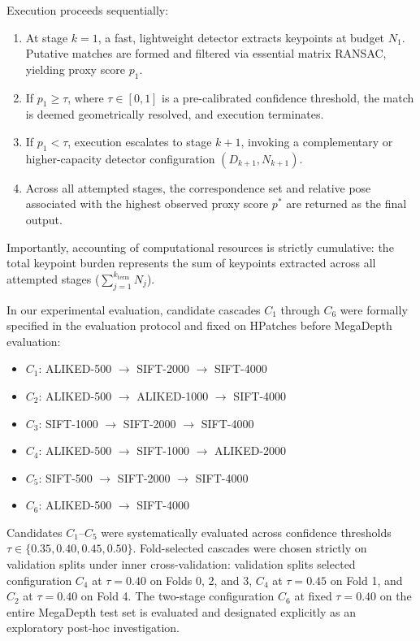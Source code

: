 \documentclass[conference]{IEEEtran}
\begin{document}
Execution proceeds sequentially:
\begin{enumerate}
    \item At stage $k=1$, a fast, lightweight detector extracts keypoints at budget $N_1$. Putative matches are formed and filtered via essential matrix RANSAC, yielding proxy score $p_1$.
    \item If $p_1 \ge \tau$, where $\tau \in [0, 1]$ is a pre-calibrated confidence threshold, the match is deemed geometrically resolved, and execution terminates.
    \item If $p_1 < \tau$, execution escalates to stage $k+1$, invoking a complementary or higher-capacity detector configuration $(D_{k+1}, N_{k+1})$.
    \item Across all attempted stages, the correspondence set and relative pose associated with the highest observed proxy score $p^*$ are returned as the final output.
\end{enumerate}

Importantly, accounting of computational resources is strictly cumulative: the total keypoint burden represents the sum of keypoints extracted across all attempted stages ($\sum_{j=1}^{k_{\text{term}}} N_j$).

In our experimental evaluation, candidate cascades $C_1$ through $C_6$ were formally specified in the evaluation protocol and fixed on HPatches before MegaDepth evaluation:
\begin{itemize}
    \item $C_1$: ALIKED-500 $\to$ SIFT-2000 $\to$ SIFT-4000
    \item $C_2$: ALIKED-500 $\to$ ALIKED-1000 $\to$ SIFT-4000
    \item $C_3$: SIFT-1000 $\to$ SIFT-2000 $\to$ SIFT-4000
    \item $C_4$: ALIKED-500 $\to$ SIFT-1000 $\to$ ALIKED-2000
    \item $C_5$: SIFT-500 $\to$ SIFT-2000 $\to$ SIFT-4000
    \item $C_6$: ALIKED-500 $\to$ SIFT-4000
\end{itemize}
Candidates $C_1$--$C_5$ were systematically evaluated across confidence thresholds $\tau \in \{0.35, 0.40, 0.45, 0.50\}$. Fold-selected cascades were chosen strictly on validation splits under inner cross-validation: validation splits selected configuration $C_4$ at $\tau = 0.40$ on Folds 0, 2, and 3, $C_4$ at $\tau = 0.45$ on Fold 1, and $C_2$ at $\tau = 0.40$ on Fold 4. The two-stage configuration $C_6$ at fixed $\tau = 0.40$ on the entire MegaDepth test set is evaluated and designated explicitly as an exploratory post-hoc investigation.
\end{document}
